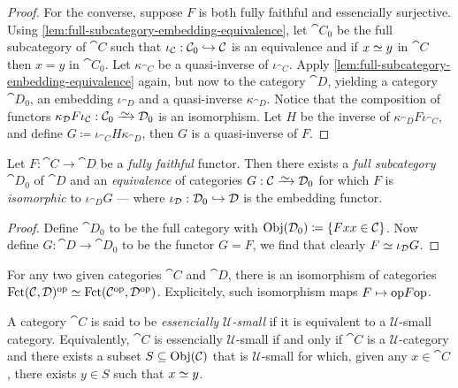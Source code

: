 \begin{proof}
For the converse, suppose \(F\) is both fully faithful and essencially
surjective. Using \cref{lem:full-subcategory-embedding-equivalence}, let
\(\cat C_0\) be the full subcategory of \(\cat C\) such that
\(\iota_{\mathcal C}: \mathcal C_0 \hookrightarrow \mathcal C\) is an equivalence and if \(x \simeq y\)
in \(\cat C\) then \(x = y\) in \(\cat C_0\). Let \(\kappa_{\cat C}\) be a
quasi-inverse of \(\iota_{\cat C}\). Apply
\cref{lem:full-subcategory-embedding-equivalence} again, but now to the category
\(\cat D\), yielding a category \(\cat D_0\), an embedding \(\iota_{\cat D}\)
and a quasi-inverse \(\kappa_{\cat D}\). Notice that the composition of functors
\(\kappa_{\cat D} F \iota_{\cat C}: \cat C_0 \isoto \cat D_0\) is an
isomorphism. Let \(H\) be the inverse of \(\kappa_{\cat D} F \iota_{\cat C}\),
and define \(G \coloneq \iota_{\cat C} H \kappa_{\cat D}\), then \(G\) is a
quasi-inverse of \(F\).
\end{proof}

\begin{corollary}
\label{cor:fully-faithful-induces-equivalence-to-full-subcategory}
Let \(F: \cat C \to \cat D\) be a \emph{fully faithful} functor. Then there
exists a \emph{full subcategory} \(\cat D_0\) of \(\cat D\) and an
\emph{equivalence} of categories \(G: \cat C \isoto \cat D_0\) for which \(F\)
is \emph{isomorphic} to \(\iota_{\cat D} G\) --- where
\(\iota_{\mathcal D}: \mathcal D_0 \hookrightarrow \mathcal D\) is the embedding functor.
\end{corollary}

\begin{proof}
Define \(\cat D_0\) to be the full category with
\(\operatorname{Obj}(\mathcal D_0) \coloneq \{F x \relax x \in \mathcal C\}\). Now define
\(G: \cat D \to \cat D_0\) to be the functor \(G = F\), we find that clearly
\(F \simeq \iota_{\mathcal D} G\).
\end{proof}

\begin{example}
\label{exp:equivalence-category-functor-opposite}
For any two given categories \(\cat C\) and \(\cat D\), there is an isomorphism
of categories \(\operatorname{Fct}(\mathcal C, \mathcal D)^{\mathrm{op}} \simeq \operatorname{Fct}(\mathcal C^{\mathrm{op}}, \mathcal
D^{\mathrm{op}})\). Explicitely, such isomorphism maps \(F \mapsto \mathrm{op} F \mathrm{op}\).
\end{example}

\begin{definition}
\label{def:essencially-U-small}
A category \(\cat C\) is said to be \emph{essencially \(\mathcal{U}\)-small} if
it is equivalent to a \(\mathcal{U}\)-small category. Equivalently, \(\cat C\)
is essencially \(\mathcal{U}\)-small if and only if \(\cat C\) is a
\(\mathcal{U}\)-category and there exists a subset \(S \subseteq \operatorname{Obj}(\mathcal C)\)
that is \(\mathcal{U}\)-small for which, given any \(x \in \cat C\), there
exists \(y \in S\) such that \(x \simeq y\).
\end{definition}


